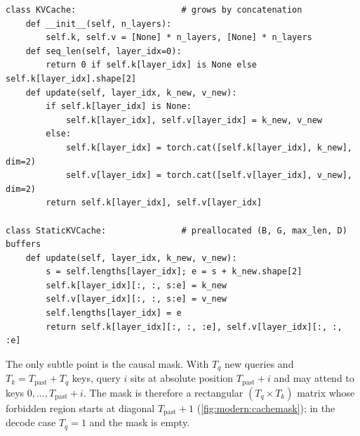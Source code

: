 \begin{lstlisting}[caption={The two cache flavours (from \ident{llmsys/kvcache.py}, abridged).},label={lst:modern:kv}]
class KVCache:                     # grows by concatenation
    def __init__(self, n_layers):
        self.k, self.v = [None] * n_layers, [None] * n_layers
    def seq_len(self, layer_idx=0):
        return 0 if self.k[layer_idx] is None else self.k[layer_idx].shape[2]
    def update(self, layer_idx, k_new, v_new):
        if self.k[layer_idx] is None:
            self.k[layer_idx], self.v[layer_idx] = k_new, v_new
        else:
            self.k[layer_idx] = torch.cat([self.k[layer_idx], k_new], dim=2)
            self.v[layer_idx] = torch.cat([self.v[layer_idx], v_new], dim=2)
        return self.k[layer_idx], self.v[layer_idx]

class StaticKVCache:               # preallocated (B, G, max_len, D) buffers
    def update(self, layer_idx, k_new, v_new):
        s = self.lengths[layer_idx]; e = s + k_new.shape[2]
        self.k[layer_idx][:, :, s:e] = k_new
        self.v[layer_idx][:, :, s:e] = v_new
        self.lengths[layer_idx] = e
        return self.k[layer_idx][:, :, :e], self.v[layer_idx][:, :, :e]
\end{lstlisting}

The only subtle point is the causal mask. With $T_q$ new queries and $T_k=T_\text{past}+T_q$ keys, query
$i$ sits at absolute position $T_\text{past}+i$ and may attend to keys $0,\ldots,T_\text{past}+i$. The
mask is therefore a rectangular $(T_q\times T_k)$ matrix whose forbidden region starts at diagonal
$T_\text{past}+1$ (\cref{fig:modern:cachemask}); in the decode case $T_q=1$ and the mask is empty.

